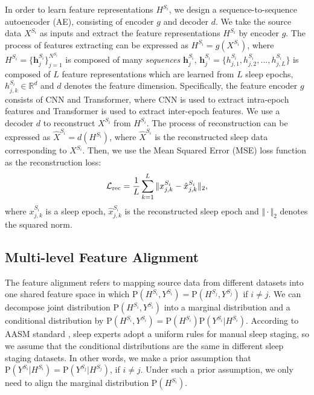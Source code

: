 \documentclass[letterpaper]{article} %
\begin{document}
	In order to learn feature representations $H^{S_i}$, we design a sequence-to-sequence autoencoder (AE), consisting of encoder $g$ and decoder $d$.
	We take the source data $X^{S_i}$ as inputs and extract the feature representations $H^{S_i}$ by encoder $g$.
	The process of features extracting can be expressed as $H^{S_i}=g(X^{S_i})$,
	where $H^{S_i} = \{\mathrm{\mathbf{h}}^{S_i}_j\}^{N^{S_i}}_{j=1}$ is composed of many \textit{sequences}  $\mathrm{\mathbf{h}}^{S_i}_j$, $\mathrm{\mathbf{h}}^{S_i}_j = \{h^{S_i}_{j, 1}, h^{S_i}_{j, 2}, ... , h^{S_i}_{j, L}\}$ is composed of $L$ feature representations which are learned from $L$ sleep epochs, $h^{S_i}_{j, k} \in \mathbb{R}^{d}$ and $d$ denotes the feature dimension.
	Specifically, the feature encoder $g$ consists of CNN and Transformer, where CNN is used to extract intra-epoch features and Transformer is used to extract inter-epoch features.
	We use a decoder $d$ to reconstruct $X^{S_i}$ from $H^{S_i}$.
	The process of reconstruction can be expressed as $\hat{X}^{S_i}=d(H^{S_i})$,
	where $\hat{X}^{S_i}$ is the reconstructed sleep data corresponding to $X^{S_i}$.
	Then, we use the Mean Squared Error (MSE) loss function as the reconstruction loss:
	\begin{equation}
		\label{predicting}
		\small
		\mathcal{L}_{\mathrm{rec}} = \frac{1}{L}\sum^{L}_{k=1} \Vert x^{S_i}_{j, k} - \hat{x}^{S_i}_{j, k} \Vert_2,
	\end{equation}
	where $x^{S_i}_{j, k}$ is a sleep epoch, $\hat{x}^{S_i}_{j, k}$ is the reconstructed sleep epoch and  $\Vert \cdot \Vert_2$ denotes the squared norm.
	
	\subsection{Multi-level Feature Alignment} 
	The feature alignment refers to mapping source data from different datasets into one shared feature space in which $\mathrm{P}(H^{S_i}, Y^{S_i}) = \mathrm{P}(H^{S_j}, Y^{S_j})$ if $i \neq j$.
	We can decompose joint distribution $\mathrm{P}(H^{S_i}, Y^{S_i})$ into a marginal distribution and a conditional distribution by $\mathrm{P}(H^{S_i}, Y^{S_i}) = \mathrm{P}(H^{S_i})\mathrm{P}(Y^{S_i}|H^{S_i})$.
	According to AASM standard \citep{Iber2007TheAA}, sleep experts adopt a uniform rules for manual sleep staging, so we assume that the conditional distributions are the same in different sleep staging datasets.
	In other words, we make a prior assumption that $\mathrm{P}(Y^{S_i}|H^{S_i})=\mathrm{P}(Y^{S_j}|H^{S_j})$, if $i \neq j$.
	Under such a prior assumption, we only need to align the marginal distribution $\mathrm{P}(H^{S_i})$.
	
\end{document}
